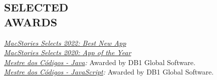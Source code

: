 \documentclass[line,margin]{res}
\begin{document}
\begin{resume}
\section{SELECTED \\ AWARDS}             
  {\sl \href{https://www.macstories.net/stories/macstories-selects-2022-recognizing-the-best-apps-of-the-year/#best-new-app}{MacStories Selects 2022: Best New App}}\\
  {\sl \href{https://www.macstories.net/stories/macstories-selects-2020-recognizing-the-best-apps-of-the-year/#app-of-the-year}{MacStories Selects 2020: App of the Year}}\\
  {\sl \href{https://mestredoscodigos.com.br/primeira-entrega-dos-pins-do-mestre-dos-codigos}{Mestre dos C\'odigos - Java}:} Awarded by DB1 Global Software.\\
  {\sl \href{https://mestredoscodigos.com.br/primeira-entrega-dos-pins-do-mestre-dos-codigos}{Mestre dos C\'odigos - JavaScript}:} Awarded by DB1 Global Software.\\
 

\end{resume}
\end{document}
